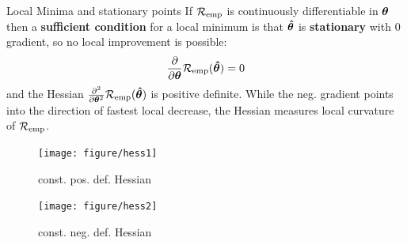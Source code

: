 \documentclass[11pt,compress,t,notes=noshow, xcolor=table]{beamer}
\begin{document}
\begin{vbframe}{Local Minima and stationary points}
\footnotesize
If $\mathcal{R}_{\text{emp}}$ is continuously differentiable in $\bm{\theta}$ then a \textbf{sufficient condition} for a local minimum is that $\bm{\hat\theta}$ is \textbf{stationary} with 0 gradient, so no local improvement is possible:
\[
\frac{\partial}{\partial\bm{\theta}}\mathcal{R}_{\text{emp}}(\bm{\hat\theta}) = 0
\]
and the Hessian $\frac{\partial^2}{\partial\bm{\theta}^2}\mathcal{R}_{\text{emp}}(\bm{\hat\theta})$ is positive definite. While the neg. gradient points into the direction of fastest local decrease, the Hessian measures local curvature of $\mathcal{R}_{\text{emp}}$.

\begin{figure}[!htb]
{
  \texttt{[image: figure/hess1]}
  \caption*{\footnotesize const. pos. def. Hessian}
}
{
  \texttt{[image: figure/hess2]}
  \caption*{\footnotesize const. neg. def. Hessian}
}
\end{figure}

\end{vbframe}




\end{document}
